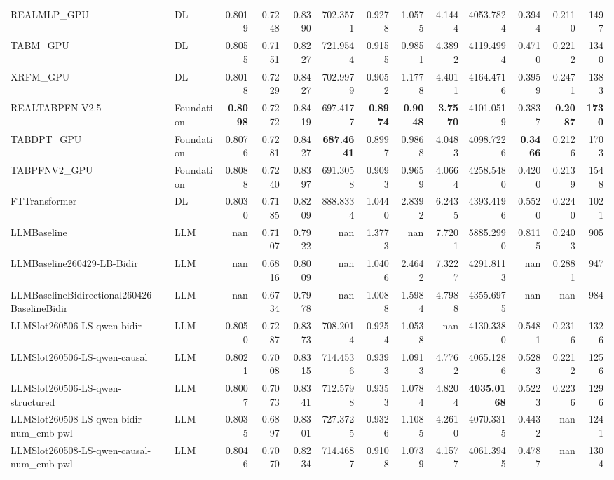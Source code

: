 \begin{table}[htbp]
{\begin{tabular}{ll|rrrrrrrrrr|r}
REALMLP\_GPU & DL & 0.8019 & 0.7248 & 0.8390 & 702.3571 & 0.9278 & 1.0575 & 4.1444 & 4053.7824 & 0.3944 & 0.2110 & 1497 \\
TABM\_GPU & DL & 0.8055 & 0.7151 & 0.8227 & 721.9544 & 0.9155 & 0.9851 & 4.3892 & 4119.4994 & 0.4710 & 0.2212 & 1340 \\
XRFM\_GPU & DL & 0.8018 & 0.7229 & 0.8427 & 702.9979 & 0.9052 & 1.1778 & 4.4011 & 4164.4716 & 0.3959 & 0.2471 & 1383 \\
REALTABPFN-V2.5 & Foundation & \textbf{0.8098} & 0.7272 & 0.8419 & 697.4177 & \textbf{0.8974} & \textbf{0.9048} & \textbf{3.7570} & 4101.0519 & 0.3837 & \textbf{0.2087} & \textbf{1730} \\
TABDPT\_GPU & Foundation & 0.8076 & 0.7281 & 0.8427 & \textbf{687.4641} & 0.8997 & 0.9868 & 4.0483 & 4098.7226 & \textbf{0.3466} & 0.2126 & 1703 \\
TABPFNV2\_GPU & Foundation & 0.8088 & 0.7240 & 0.8397 & 691.3058 & 0.9093 & 0.9659 & 4.0664 & 4258.5480 & 0.4200 & 0.2139 & 1548 \\
\midrule
FTTransformer & DL & 0.8030 & 0.7185 & 0.8209 & 888.8334 & 1.0440 & 2.8392 & 6.2435 & 4393.4196 & 0.5520 & 0.2240 & 1021 \\
LLMBaseline & LLM & nan & 0.7107 & 0.7922 & nan & 1.3773 & nan & 7.7201 & 5885.2990 & 0.8115 & 0.2403 & 905 \\
LLMBaseline260429-LB-Bidir & LLM & nan & 0.6816 & 0.8009 & nan & 1.0406 & 2.4642 & 7.3227 & 4291.8113 & nan & 0.2881 & 947 \\
LLMBaselineBidirectional260426-BaselineBidir & LLM & nan & 0.6734 & 0.7978 & nan & 1.0088 & 1.5984 & 4.7988 & 4355.6975 & nan & nan & 984 \\
LLMSlot260506-LS-qwen-bidir & LLM & 0.8050 & 0.7287 & 0.8373 & 708.2014 & 0.9254 & 1.0538 & nan & 4130.3380 & 0.5481 & 0.2316 & 1326 \\
LLMSlot260506-LS-qwen-causal & LLM & 0.8021 & 0.7008 & 0.8315 & 714.4536 & 0.9393 & 1.0913 & 4.7762 & 4065.1286 & 0.5283 & 0.2212 & 1256 \\
LLMSlot260506-LS-qwen-structured & LLM & 0.8007 & 0.7073 & 0.8341 & 712.5798 & 0.9353 & 1.0784 & 4.8204 & \textbf{4035.0168} & 0.5223 & 0.2236 & 1296 \\
LLMSlot260508-LS-qwen-bidir-num\_emb-pwl & LLM & 0.8035 & 0.6897 & 0.8301 & 727.3725 & 0.9326 & 1.1085 & 4.2610 & 4070.3315 & 0.4432 & nan & 1241 \\
LLMSlot260508-LS-qwen-causal-num\_emb-pwl & LLM & 0.8046 & 0.7070 & 0.8234 & 714.4687 & 0.9108 & 1.0739 & 4.1577 & 4061.3945 & 0.4787 & nan & 1304 \\

\end{tabular}}
\end{table}
